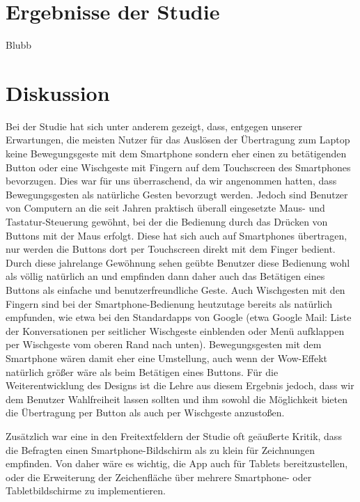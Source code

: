 \documentclass{chi-ext}
\begin{document}
\section{Ergebnisse der Studie}
Blubb

\section{Diskussion}
Bei der Studie hat sich unter anderem gezeigt, dass, entgegen unserer Erwartungen, die meisten Nutzer für das Auslösen der Übertragung zum Laptop keine Bewegungsgeste mit dem Smartphone sondern eher einen zu betätigenden Button oder eine Wischgeste mit Fingern auf dem Touchscreen des Smartphones bevorzugen. Dies war für uns überraschend, da wir angenommen hatten, dass Bewegungsgesten als natürliche Gesten bevorzugt werden. Jedoch sind Benutzer von Computern an die seit Jahren praktisch überall eingesetzte Maus- und Tastatur-Steuerung gewöhnt, bei der die Bedienung durch das Drücken von Buttons mit der Maus erfolgt. Diese hat sich auch auf Smartphones übertragen, nur werden die Buttons dort per Touchscreen direkt mit dem Finger bedient. Durch diese jahrelange Gewöhnung sehen geübte Benutzer diese Bedienung wohl als völlig natürlich an und empfinden dann daher auch das Betätigen eines Buttons als einfache und benutzerfreundliche Geste. Auch Wischgesten mit den Fingern sind bei der Smartphone-Bedienung heutzutage bereits als natürlich empfunden, wie etwa bei den Standardapps von Google (etwa Google Mail: Liste der Konversationen per seitlicher Wischgeste einblenden oder Menü aufklappen per Wischgeste vom oberen Rand nach unten).
Bewegungsgesten mit dem Smartphone wären damit eher eine Umstellung, auch wenn der Wow-Effekt natürlich größer wäre als beim Betätigen eines Buttons. Für die Weiterentwicklung des Designs ist die Lehre aus diesem Ergebnis jedoch, dass wir dem Benutzer Wahlfreiheit lassen sollten und ihm sowohl die Möglichkeit bieten die Übertragung per Button als auch per Wischgeste anzustoßen. 

Zusätzlich war eine in den Freitextfeldern der Studie oft geäußerte Kritik, dass die Befragten einen Smartphone-Bildschirm als zu klein für Zeichnungen empfinden. Von daher wäre es wichtig, die App auch für Tablets bereitzustellen, oder die Erweiterung der Zeichenfläche über mehrere Smartphone- oder Tabletbildschirme zu implementieren.
\end{document}
